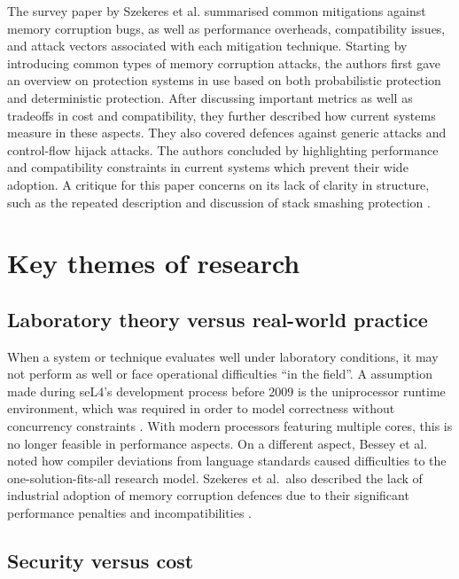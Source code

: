 \documentclass[11pt]{article}
\begin{document}
The survey paper by Szekeres et al. \cite{szekeres2013sok} summarised common mitigations against memory corruption bugs, as well as performance overheads, compatibility issues, and attack vectors associated with each mitigation technique. Starting by introducing common types of memory corruption attacks, the authors first gave an overview on protection systems in use based on both probabilistic protection and deterministic protection. After discussing important metrics as well as tradeoffs in cost and compatibility, they further described how current systems measure in these aspects. They also covered defences against generic attacks and control-flow hijack attacks. The authors concluded by highlighting performance and compatibility constraints in current systems which prevent their wide adoption. A critique for this paper concerns on its lack of clarity in structure, such as the repeated description and discussion of stack smashing protection \cite[III, VIII-B]{szekeres2013sok}.

\section{Key themes of research}

\subsection{Laboratory theory versus real-world practice}

When a system or technique evaluates well under laboratory conditions, it may not perform as well or face operational difficulties ``in the field''. A  assumption made during seL4's development process before 2009 is the uniprocessor runtime environment, which was required in order to model correctness without concurrency constraints \cite[3.3]{klein2009sel4}. With modern processors featuring multiple cores, this is no longer feasible in performance aspects. On a different aspect, Bessey et al. \cite[pp. 69-70]{bessey2010few} noted how compiler deviations from language standards caused difficulties to the one-solution-fits-all research model. Szekeres et al.\ also described the lack of industrial adoption of memory corruption defences due to their significant performance penalties and incompatibilities \cite[I, IV-C]{szekeres2013sok}.

\subsection{Security versus cost}
\end{document}
